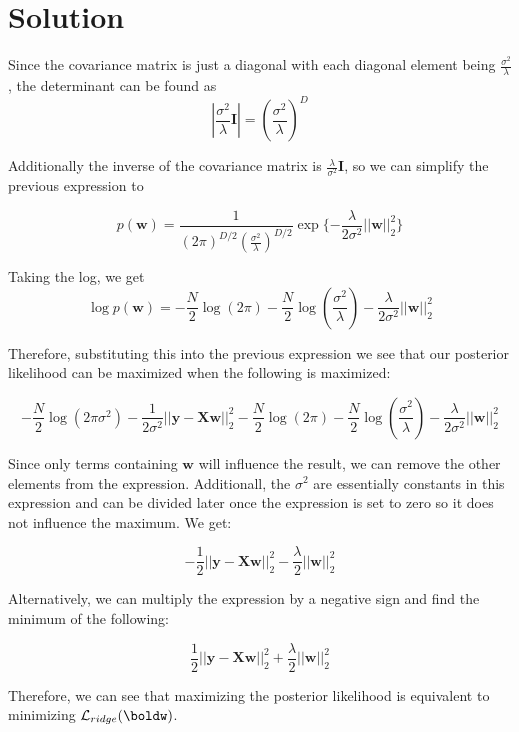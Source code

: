 \documentclass[submit]{../harvardml}
\newenvironment{solution}
  {\color{blue}\section*{Solution}}
{}
\begin{document}
\begin{solution}
\begin{enumerate}
        Since the covariance matrix is just a diagonal with each diagonal element being $\frac{\sigma^2}{\lambda}$, the determinant can be found as
        \[
        \left|\frac{\sigma^2}{\lambda}\bm I\right| = \left(\frac{\sigma^2}{\lambda}\right)^D
        \]

        Additionally the inverse of the covariance matrix is $\frac{\lambda}{\sigma^2}\bm I$, so we can simplify the previous expression to

        \[
        p(\bm w) = \frac{1}{(2\pi)^{D/2}\left(\frac{\sigma^2}{\lambda}\right)^{D/2}}\exp\{-\frac{\lambda}{2\sigma^2}||\bm w||^2_2\}
        \]

        Taking the log, we get
        \[
        \log p(\bm w) = -\frac{N}{2}\log(2\pi)-\frac{N}{2}\log\left(\frac{\sigma^2}{\lambda}\right)-\frac{\lambda}{2\sigma^2}||\bm w||^2_2
        \]

        Therefore, substituting this into the previous expression we see that our posterior likelihood can be maximized when the following is maximized:

        \[
        -\frac{N}{2}\log(2\pi\sigma^2)-\frac{1}{2\sigma^2}||\bm y-\bm X \bm w||^2_2 -\frac{N}{2}\log(2\pi)-\frac{N}{2}\log\left(\frac{\sigma^2}{\lambda}\right)-\frac{\lambda}{2\sigma^2}||\bm w||^2_2
        \]

        Since only terms containing $\bm w$ will influence the result, we can remove the other elements from the expression. Additionall, the $\sigma^2$ are essentially constants in this expression and can be divided later once the expression is set to zero so it does not influence the maximum. We get:

        \[
        -\frac{1}{2}||\bm y-\bm X \bm w||^2_2 -\frac{\lambda}{2}||\bm w||^2_2
        \]

        Alternatively, we can multiply the expression by a negative sign and find the minimum of the following:

        \[
        \frac{1}{2}||\bm y-\bm X \bm w||^2_2 +\frac{\lambda}{2}||\bm w||^2_2
        \]

        Therefore, we can see that maximizing the posterior likelihood is equivalent to minimizing $\mathcal{L}_{ridge}(\boldw)$.


\end{enumerate}
\end{solution}
\end{document}
